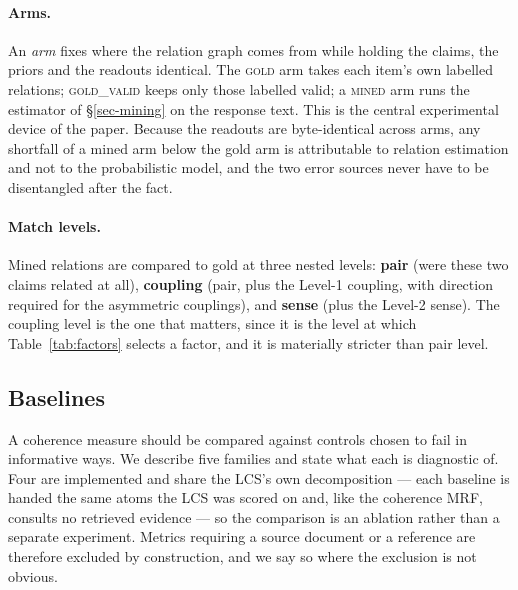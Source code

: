 \paragraph{Arms.} An \emph{arm} fixes where the relation graph comes from while holding the claims,
the priors and the readouts identical. The \textsc{gold} arm takes each item's own labelled relations;
\textsc{gold\_valid} keeps only those labelled valid; a \textsc{mined} arm runs the estimator of
\S\ref{sec-mining} on the response text. This is the central experimental device of the paper. Because
the readouts are byte-identical across arms, any shortfall of a mined arm below the gold arm is
attributable to relation estimation and not to the probabilistic model, and the two error sources
never have to be disentangled after the fact.

\paragraph{Match levels.} Mined relations are compared to gold at three nested levels: \textbf{pair}
(were these two claims related at all), \textbf{coupling} (pair, plus the Level-1 coupling, with
direction required for the asymmetric couplings), and \textbf{sense} (plus the Level-2 sense). The
coupling level is the one that matters, since it is the level at which Table~\ref{tab:factors} selects
a factor, and it is materially stricter than pair level.

\subsection{Baselines}
\label{sec-baselines}

A coherence measure should be compared against controls chosen to fail in informative ways. We
describe five families and state what each is diagnostic of. Four are implemented and share the
LCS's own decomposition --- each baseline is handed the same atoms the LCS was scored on and, like
the coherence MRF, consults no retrieved evidence --- so the comparison is an ablation rather than a
separate experiment. Metrics requiring a source document or a reference are therefore excluded by
construction, and we say so where the exclusion is not obvious.

